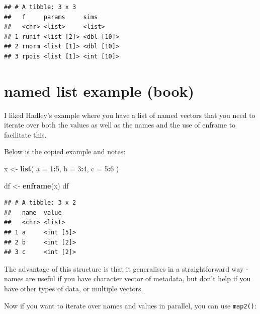 \documentclass[]{book}
\newenvironment{Shaded}{\begin{snugshade}}{\end{snugshade}}
\newcommand{\DataTypeTok}[1]{\textcolor[rgb]{0.13,0.29,0.53}{#1}}
\newcommand{\DecValTok}[1]{\textcolor[rgb]{0.00,0.00,0.81}{#1}}
\newcommand{\KeywordTok}[1]{\textcolor[rgb]{0.13,0.29,0.53}{\textbf{#1}}}
\newcommand{\NormalTok}[1]{#1}
\newcommand{\OperatorTok}[1]{\textcolor[rgb]{0.81,0.36,0.00}{\textbf{#1}}}
\newcommand{\StringTok}[1]{\textcolor[rgb]{0.31,0.60,0.02}{#1}}
\theoremstyle{definition}
\theoremstyle{definition}
\theoremstyle{definition}
\theoremstyle{remark}
\begin{document}
\begin{verbatim}
## # A tibble: 3 x 3
##   f     params     sims      
##   <chr> <list>     <list>    
## 1 runif <list [2]> <dbl [10]>
## 2 rnorm <list [1]> <dbl [10]>
## 3 rpois <list [1]> <int [10]>
\end{verbatim}

\hypertarget{named-list-example-book}{%
\section{named list example (book)}\label{named-list-example-book}}

I liked Hadley's example where you have a list of named vectors that you
need to iterate over both the values as well as the names and the use of
enframe to facilitate this.

Below is the copied example and notes:

\begin{Shaded}
\begin{Highlighting}[]
\NormalTok{x <-}\StringTok{ }\KeywordTok{list}\NormalTok{(}
  \DataTypeTok{a =} \DecValTok{1}\OperatorTok{:}\DecValTok{5}\NormalTok{,}
  \DataTypeTok{b =} \DecValTok{3}\OperatorTok{:}\DecValTok{4}\NormalTok{, }
  \DataTypeTok{c =} \DecValTok{5}\OperatorTok{:}\DecValTok{6}
\NormalTok{) }

\NormalTok{df <-}\StringTok{ }\KeywordTok{enframe}\NormalTok{(x)}
\NormalTok{df}
\end{Highlighting}
\end{Shaded}

\begin{verbatim}
## # A tibble: 3 x 2
##   name  value    
##   <chr> <list>   
## 1 a     <int [5]>
## 2 b     <int [2]>
## 3 c     <int [2]>
\end{verbatim}

The advantage of this structure is that it generalises in a
straightforward way - names are useful if you have character vector of
metadata, but don't help if you have other types of data, or multiple
vectors.

Now if you want to iterate over names and values in parallel, you can
use \texttt{map2()}:

\begin{Shaded}
\end{Shaded}
\end{document}
